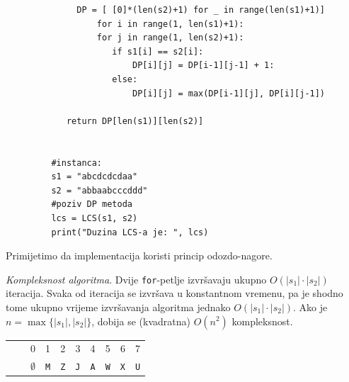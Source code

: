\begin{solution}
\begin{verbatim}
	    	  DP = [ [0]*(len(s2)+1) for _ in range(len(s1)+1)]
	              for i in range(1, len(s1)+1):
	    	      for j in range(1, len(s2)+1):
	    		     if s1[i] == s2[i]: 
	    		         DP[i][j] = DP[i-1][j-1] + 1:
	    		     else:
	    		         DP[i][j] = max(DP[i-1][j], DP[i][j-1])
	    		          
	    	return DP[len(s1)][len(s2)]        
	    		           
	    	      
	     #instanca:
	     s1 = "abcdcdcdaa"
	     s2 = "abbaabcccddd"
	     #poziv DP metoda
	     lcs = LCS(s1, s2)
	     print("Duzina LCS-a je: ", lcs)     
 \end{verbatim}
	     Primijetimo da implementacija koristi princip odozdo-nagore.
	     
	     \textit{Kompleksnost algoritma}. Dvije \texttt{for}-petlje  izvršavaju ukupno $O(|s_1|\cdot |s_2|)$ iteracija. Svaka od iteracija se izvršava u konstantnom vremenu, pa je shodno tome ukupno vrijeme izvršavanja algoritma jednako $O(|s_1| \cdot |s_2|)$. Ako je $n = \max\{|s_1|, |s_2|\}$, dobija se (kvadratna) $O(n^2)$ kompleksnost. 
	     
     
     \begin{table}
     	  \centering
     	  \begin{tabular}{cc|cccccccc}
     	  	& & 0&1 &2 &3 &4 &5 &6 &7   \\
     	  
     	  	& & $\emptyset$&\texttt{M} &\texttt{Z} &\texttt{J} &\texttt{A} &\texttt{W} &\texttt{X} &\texttt{U}  \\ \hline \hline
     	  	

\end{tabular}
\end{table}
\end{solution}
